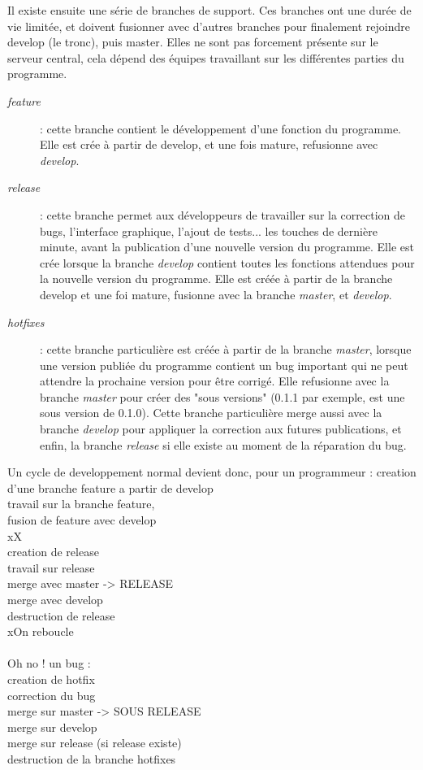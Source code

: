Il existe ensuite une série de branches de support. Ces branches ont une durée de vie limitée, et doivent fusionner avec d'autres branches pour finalement rejoindre develop (le tronc), puis master. Elles ne sont pas forcement présente sur le serveur central, cela dépend des équipes travaillant sur les différentes parties du programme.
\begin{description}
  \item[\emph{feature}] : cette branche contient le développement d'une fonction du programme. Elle est crée à partir de develop, et une fois mature, refusionne avec \emph{develop}.
  \item[\emph{release}] : cette branche permet aux développeurs de travailler sur la correction de bugs, l'interface graphique, l'ajout de tests... les touches de dernière minute, avant la publication d'une nouvelle version du programme. Elle est crée lorsque la branche \emph{develop} contient toutes les fonctions attendues pour la nouvelle version du programme. Elle est créée à partir de la branche develop et une foi mature, fusionne avec la branche \emph{master}, et \emph{develop}.
  \item[\emph{hotfixes}] : cette branche particulière est créée à partir de la branche \emph{master}, lorsque une version publiée du programme contient un bug important qui ne peut attendre la prochaine version pour être corrigé. Elle refusionne avec la branche \emph{master} pour créer des "sous versions" (0.1.1 par exemple, est une sous version de 0.1.0). Cette branche particulière merge aussi avec la branche \emph{develop} pour appliquer la correction aux futures publications, et enfin, la branche \emph{release} si elle existe au moment de la réparation du bug.
\end{description}

Un cycle de developpement normal devient donc, pour un programmeur :
creation d'une branche feature a partir de develop\\
travail sur la branche feature,\\
fusion de feature avec develop\\
xX\\
creation de release\\
travail sur release\\
merge avec master -> RELEASE\\
merge avec develop\\
destruction de release\\
xOn reboucle\\
\\
Oh no ! un bug :\\
creation de hotfix\\
correction du bug\\
merge sur master -> SOUS RELEASE\\
merge sur develop\\
merge sur release (si release existe)\\
destruction de la branche hotfixes\\


